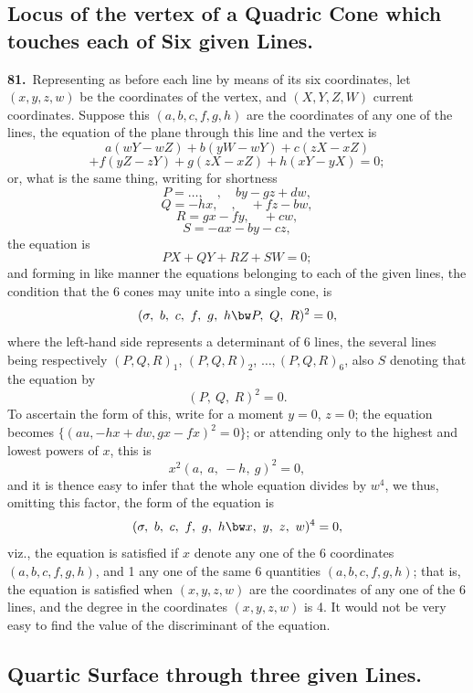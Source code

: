 \documentclass[11pt,a4paper]{article}
\begin{document}
\newpage
\setcounter{page}{164}

\subsection*{Locus of the vertex of a Quadric Cone which touches each of Six given Lines.}

\noindent\textbf{81.}\ Representing as before each line by means of its six coordinates, let $(x, y, z, w)$ be the coordinates of the vertex, and $(X, Y, Z, W)$ current coordinates. Suppose this $(a, b, c, f, g, h)$ are the coordinates of any one of the lines, the equation of the plane through this line and the vertex is
\[
a(wY - wZ) + b(yW - wY) + c(zX - xZ)
\]
\[
+ f(yZ - zY) + g(zX - xZ) + h(xY - yX) = 0;
\]
or, what is the same thing, writing for shortness
\[
P = \ldots,\quad ,\quad by - gz + dw,
\]
\[
Q = -hx,\quad ,\quad + fz - bw,
\]
\[
R = gx - fy,\quad + cw,
\]
\[
S = -ax - by - cz,
\]
the equation is
\[
PX + QY + RZ + SW = 0;
\]
and forming in like manner the equations belonging to each of the given lines, the condition that the 6 cones may unite into a single cone, is
\[
(\sigma,\ b,\ c,\ f,\ g,\ h \bw P,\ Q,\ R)^2 = 0,
\]
where the left-hand side represents a determinant of 6 lines, the several lines being respectively $(P, Q, R)_1$, $(P, Q, R)_2$, $\ldots, (P, Q, R)_6$, also $S$ denoting that the equation by
\[
(P,\ Q,\ R)^2 = 0.
\]
To ascertain the form of this, write for a moment $y = 0$, $z = 0$; the equation becomes $\{(au, -hx + dw, gx - fx)^2 = 0\}$; or attending only to the highest and lowest powers of $x$, this is
\[
x^2(a,\ a,\ -h,\ g)^2 = 0,
\]
and it is thence easy to infer that the whole equation divides by $w^4$, we thus, omitting this factor, the form of the equation is
\[
(\sigma,\ b,\ c,\ f,\ g,\ h \bw x,\ y,\ z,\ w)^4 = 0,
\]
viz., the equation is satisfied if $x$ denote any one of the 6 coordinates $(a, b, c, f, g, h)$, and 1 any one of the same 6 quantities $(a, b, c, f, g, h)$; that is, the equation is satisfied when $(x, y, z, w)$ are the coordinates of any one of the 6 lines, and the degree in the coordinates $(x, y, z, w)$ is 4. It would not be very easy to find the value of the discriminant of the equation.

\newpage
\setcounter{page}{165}

\subsection*{Quartic Surface through three given Lines.}
\end{document}
